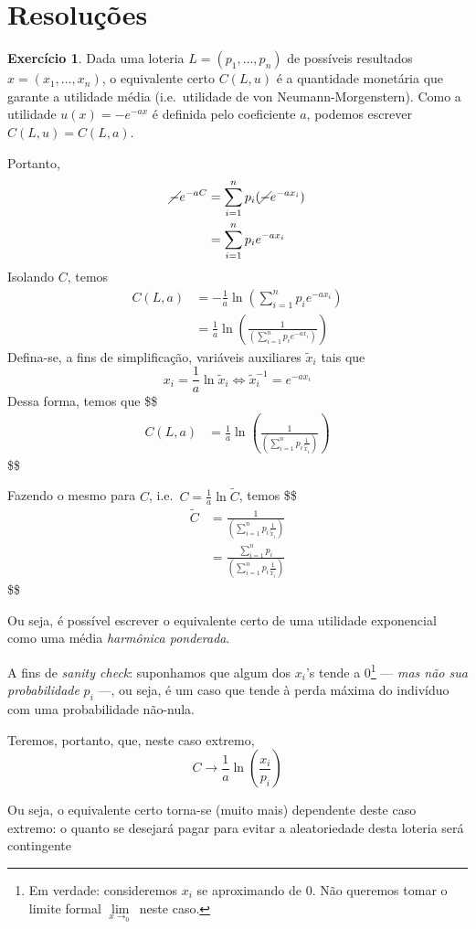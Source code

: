 \documentclass[12pt]{article}
\numberwithin{equation}{section}
\theoremstyle{plain}
\theoremstyle{definition}
\newtheorem{exercise}{Exercício}[section]
\theoremstyle{remark}
\begin{document}
\hypertarget{resoluuxe7uxf5es}{%
\section{Resoluções}\label{resoluuxe7uxf5es}}

\begin{exercise}
Dada uma loteria \(L = (p_{1},\dots,p_{n})\) de possíveis resultados
\(x=(x_{1},\dots,x_{n})\), o equivalente certo \(C(L, u)\) é a
quantidade monetária que garante a utilidade média (i.e.~utilidade de
von Neumann-Morgenstern). Como a utilidade \(u(x) = - e^{-ax}\) é
definida pelo coeficiente \(a\), podemos escrever \(C(L, u) = C(L, a)\).

Portanto,
\[
\begin{align*}
\cancel{ - }e^{-aC} &= \sum \limits_{i=1}^{n} p_{i} (\cancel{ - }e^{-ax_{i}}) \\
&= \sum \limits_{i=1}^{n} p_{i} e^{-ax_{i}}
\end{align*}
\]
Isolando \(C\), temos
\[
\begin{align*}
C(L, a) &= -\frac{1}{a} \ln\left( \sum \limits_{i=1}^{n}p_{i} e^{-ax_{i}} \right) \\
&= \frac{1}{a}\ln \left( \frac{1}{\left( \sum \limits_{i=1}^{n}p_{i} e^{-ax_{i}} \right)} \right)
\end{align*}
\]
Defina-se, a fins de simplificação, variáveis auxiliares
\(\tilde{x}_{i}\) tais que
\[
x_{i} = \frac{1}{a} \ln \tilde{x}_{i} \iff \tilde{x}_{i}^{-1} = e^{-ax_{i}}
\]
Dessa forma, temos que \$\$ \begin{align*}
C(L, a) &= \frac{1}{a}  \ln \left( \frac{1}{\left( \sum \limits_{i=1}^{n}p_{i} \frac{1}{\tilde{x}_{i}} \right)} \right) 

\end{align*} \$\$

Fazendo o mesmo para \(C\), i.e.~\(C = \frac{1}{a}\ln \tilde{C}\), temos
\$\$ \begin{align*}
\tilde{C} &= \frac{1}{\left( \sum \limits_{i=1}^{n}p_{i} \frac{1}{\tilde{x}_{i}} \right)}  \\
&= \frac{\sum \limits_{i=1}^{n} p_{i}}{\left( \sum \limits_{i=1}^{n}p_{i} \frac{1}{\tilde{x}_{i}} \right)} 

\end{align*} \$\$

Ou seja, é possível escrever o equivalente certo de uma utilidade
exponencial como uma média \textit{harmônica ponderada}.

A fins de \textit{sanity check}: suponhamos que algum dos \(x_{i}\)'s
tende a \(0\)\footnote{Em verdade: consideremos \(x_{i}\) se aproximando
  de \(0\). Não queremos tomar o limite formal
  \(\lim\limits_{x\to_{0}}\) neste caso.} --- \textit{mas não sua
probabilidade} \(p_i\) ---, ou seja, é um caso que tende à perda máxima
do indivíduo com uma probabilidade não-nula.

Teremos, portanto, que, neste caso extremo,
\[
C \to \frac{1}{a}  \ln \left( \frac{x_{i}}{p_{i}}\right) 
\]

Ou seja, o equivalente certo torna-se (muito mais) dependente deste caso
extremo: o quanto se desejará pagar para evitar a aleatoriedade desta
loteria será contingente
\end{exercise}
\end{document}

